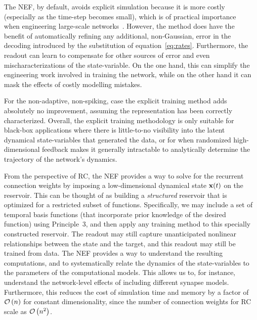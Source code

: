The NEF, by default, avoids explicit simulation because it is more costly (especially as the time-step becomes small), which is of practical importance when engineering large-scale networks~\citep[e.g.,][]{eliasmith2012}.
However, the method does have the benefit of automatically refining any additional, non-Gaussian, error in the decoding introduced by the substitution of equation~\ref{eq:rates}.
Furthermore, the readout can learn to compensate for other sources of error and even mischaracterizations of the state-variable.
On the one hand, this can simplify the engineering work involved in training the network, while on the other hand it can mask the effects of costly modelling mistakes.

For the non-adaptive, non-spiking, case the explicit training method adds absolutely no improvement, assuming the representation has been correctly characterized.
Overall, the explicit training methodology is only suitable for black-box applications where there is little-to-no visibility into the latent dynamical state-variables that generated the data, or for when randomized high-dimensional feedback makes it generally intractable to analytically determine the trajectory of the network's dynamics.

From the perspective of RC, the NEF provides a way to solve for the recurrent connection weights by imposing a low-dimensional dynamical state $\mathbf{x}(t)$ on the reservoir.
This can be thought of as building a  \emph{structured} reservoir that is optimized for a restricted subset of functions.
Specifically, we may include a set of temporal basis functions (that incorporate prior knowledge of the desired function) using Principle~3, and then apply any training method to this specially constructed reservoir.
The readout may still capture unanticipated nonlinear relationships between the state and the target, and this readout may still be trained from data.
The NEF provides a way to understand the resulting computations, and to systematically relate the dynamics of the state-variables to the parameters of the computational models.
This allows us to, for instance, understand the network-level effects of including different synapse models.
Furthermore, this reduces the cost of simulation time and memory by a factor of $\mathcal{O}\left({ n }\right)$ for constant dimensionality, since the number of connection weights for RC scale as $\mathcal{O}\left({ n^2 }\right)$.

